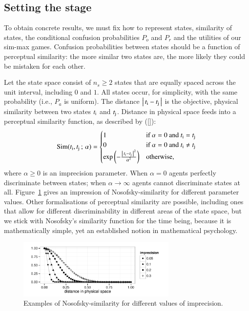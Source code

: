 \documentclass[12pt,english]{article}
\newcommand{\imprecision}{\ensuremath{\alpha}} %
\newcommand{\ns}{\ensuremath{n_s}} %
\newcommand{\similarity}{\ensuremath{\mathrm{Sim}}} %
\numberwithin{equation}{section}
\newcommand{\citetbjps}[1]{\citeauthor{#1} ([\citeyear{#1}])}
\begin{document}
\subsection{Setting the stage}
\label{sec:setting-stage}

To obtain concrete results, we must fix how to represent states, similarity of states, the
conditional confusion probabilities $P_o$ and $P_r$ and the utilities of our sim-max
games. Confusion probabilities between states should be a function of perceptual similarity:
the more similar two states are, the more likely they could be mistaken for each other. 

Let the state space consist of $\ns \ge 2$ states that are equally spaced across the unit
interval, including $0$ and $1$. All states occur, for simplicity, with the same probability
(i.e., $P_a$ is uniform).  The distance $\left \lvert \, t_{\mathrm{i}} - t_{\mathrm{j}} \, \right\rvert$ is the objective,
physical similarity between two states $t_{\mathrm{i}}$ and $t_{\mathrm{j}}$. Distance in physical
space feeds into a perceptual similarity function, as described by
\citetbjps{Nosofsky1986:Attention-Simil}:
\begin{align*}
  \similarity(\mystate{i}, \mystate{j} \myts ; \myts \imprecision) =
      \begin{cases}
    1 & \textrm{if } \imprecision = 0 \textrm{ and } \mystate{i} = \mystate{j} \\
    0 & \textrm{if } \imprecision = 0 \textrm{ and } \mystate{i} \neq \mystate{j} \\
 \expo \left ( -  \frac{\card{\mystate{i} - \mystate{j}}^2}{ \imprecision^2} \right ) & \textrm{otherwise,} \\
    \end{cases}
\end{align*}
where $\imprecision \ge 0$ is an imprecision parameter. When $\imprecision=0$ agents perfectly
discriminate between states; when $\imprecision \rightarrow \infty$ agents cannot discriminate
states at all. Figure~\ref{fig:NosofskySim} gives an impression of Nosofsky-similarity for
different parameter values. Other formalisations of perceptual similarity are possible,
including ones that allow for different discriminability in different areas of the state space,
but we stick with Nosofsky's similarity function for the time being, because it is
mathematically simple, yet an established notion in mathematical psychology.

\begin{figure}
  \centering

  \includegraphics[width=0.7\textwidth]{plots/NosofskySim.pdf}

  \caption{Examples of Nosofsky-similarity for different values of
    imprecision.}
  \label{fig:NosofskySim}
\end{figure}
\end{document}

